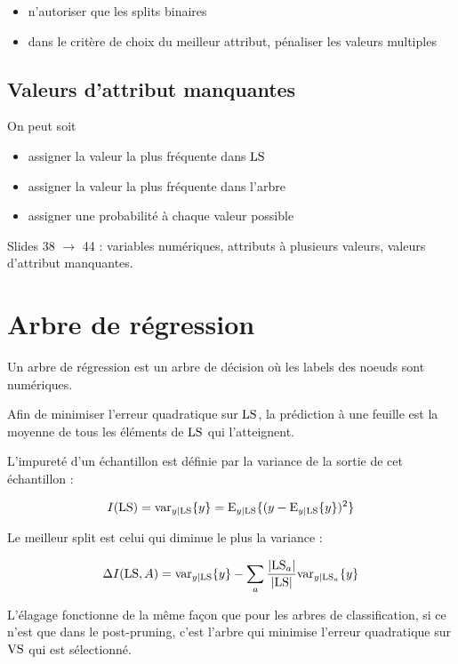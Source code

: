 	\begin{itemize}
		\item n'autoriser que les splits binaires
		\item dans le critère de choix du meilleur attribut, pénaliser les valeurs multiples
	\end{itemize}
	
	\subsection{Valeurs d'attribut manquantes}
	
	On peut soit
	\begin{itemize}
		\item assigner la valeur la plus fréquente dans $\text{LS}$
		\item assigner la valeur la plus fréquente dans l'arbre
		\item assigner une probabilité à chaque valeur possible
	\end{itemize}
	

	
	Slides 38 $\rightarrow$ 44 : variables numériques, attributs à plusieurs valeurs, valeurs d'attribut manquantes.
	
\section{Arbre de régression}
	
	Un arbre de régression est un arbre de décision où les labels des noeuds sont numériques.
	

	
	Afin de minimiser l'erreur quadratique sur $\text{LS}$, la prédiction à une feuille est la moyenne de tous les éléments de $\text{LS}$ qui l'atteignent.
	
	L'impureté d'un échantillon est définie par la variance de la sortie de cet échantillon :
	
	$$I(\text{LS}) = \text{var}_{y \vert \text{LS}} \lbrace y \rbrace = \text{E}_{y \vert \text{LS}}\lbrace (y - \text{E}_{y \vert \text{LS}}\lbrace y \rbrace)^2 \rbrace$$
	
	Le meilleur split est celui qui diminue le plus la variance :
	
	$$\Delta I(\text{LS}, A) =\text{var}_{y \vert \text{LS}} \lbrace y \rbrace - \sum_a \frac{\vert \text{LS}_a \vert}{\vert \text{LS} \vert} \text{var}_{y \vert \text{LS}_a} \lbrace y \rbrace$$

	L'élagage fonctionne de la même façon que pour les arbres de classification, si ce n'est que dans le post-pruning, c'est l'arbre qui minimise l'erreur quadratique sur $\text{VS}$ qui est sélectionné.
	
